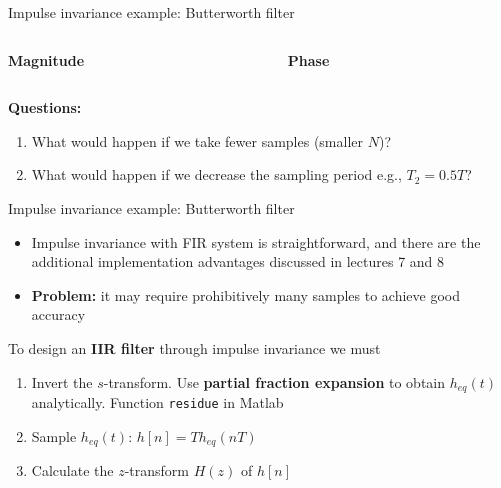 \documentclass[10pt, handout]{beamer}
\begin{document}
%
\begin{frame}{Impulse invariance example: Butterworth filter}

\begin{columns}
	\begin{column}{0.5\textwidth}
		\textbf{Magnitude}
		\begin{center}
			\resizebox{\linewidth}{!}{}
		\end{center}
	\end{column}
	\begin{column}{0.5\textwidth}
		\textbf{Phase}
		\begin{center}
			\resizebox{\linewidth}{!}{}
		\end{center}
	\end{column}
\end{columns}

\vspace{0.2cm}
\textbf{Questions:}
\begin{enumerate}
	\item What would happen if we take fewer samples (smaller $N$)?
	\item What would happen if we decrease the sampling period e.g., $T_2 = 0.5T$?
\end{enumerate}

\end{frame}

%
\begin{frame}{Impulse invariance example: Butterworth filter}

\begin{itemize}
	\item Impulse invariance with FIR system is straightforward, and there are the additional implementation advantages discussed in lectures 7 and 8
	\item \textbf{Problem:} it may require prohibitively many samples to achieve good accuracy
\end{itemize}

To design an \textbf{IIR filter} through impulse invariance we must

\begin{enumerate}
	\item Invert the $s$-transform. Use \textbf{partial fraction expansion} to obtain $h_{eq}(t)$ analytically. Function \texttt{residue} in Matlab	
	\item Sample $h_{eq}(t)$: $h[n] = Th_{eq}(nT)$
	\item Calculate the $z$-transform $H(z)$ of $h[n]$
\end{enumerate}
\end{frame}
\end{document}
